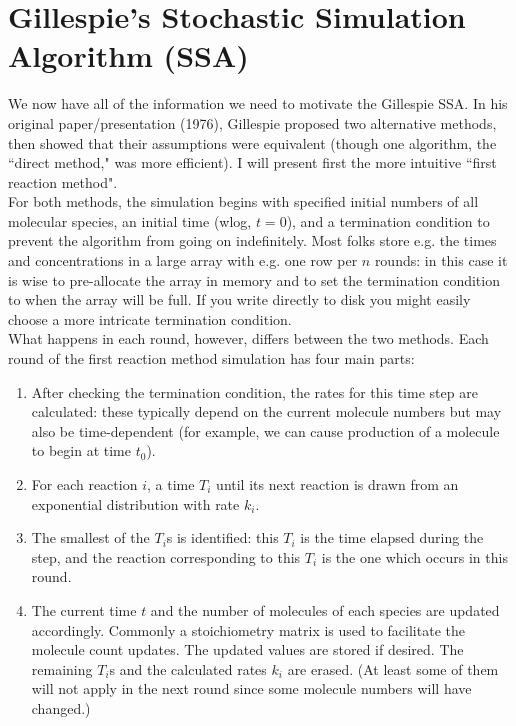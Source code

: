 \documentclass{article}
\begin{document}
\section*{Gillespie's Stochastic Simulation Algorithm (SSA)}

We now have all of the information we need to motivate the Gillespie SSA. In his original paper/presentation (1976), Gillespie proposed two alternative methods, then showed that their assumptions were equivalent (though one algorithm, the ``direct method," was more efficient). I will present first the more intuitive ``first reaction method".\\

For both methods, the simulation begins with specified initial numbers of all molecular species, an initial time (wlog, $t=0$), and a termination condition to prevent the algorithm from going on indefinitely. Most folks store e.g. the times and concentrations in a large array with e.g. one row per $n$ rounds: in this case it is wise to pre-allocate the array in memory and to set the termination condition to when the array will be full. If you write directly to disk you might easily choose a more intricate termination condition.\\

What happens in each round, however, differs between the two methods. Each round of the first reaction method simulation has four main parts:
\begin{enumerate}
\item After checking the termination condition, the rates for this time step are calculated: these typically depend on the current molecule numbers but may also be time-dependent (for example, we can cause production of a molecule to begin at time $t_0$).
\item For each reaction $i$, a time $T_i$ until its next reaction is drawn from an exponential distribution with rate $k_i$.
\item The smallest of the $T_i$s is identified: this $T_i$ is the time elapsed during the step, and the reaction corresponding to this $T_i$ is the one which occurs in this round.
\item The current time $t$ and the number of molecules of each species are updated accordingly. Commonly a stoichiometry matrix is used to facilitate the molecule count updates. The updated values are stored if desired. The remaining $T_i$s and the calculated rates $k_i$ are erased. (At least some of them will not apply in the next round since some molecule numbers will have changed.)
\end{enumerate}
\end{document}
